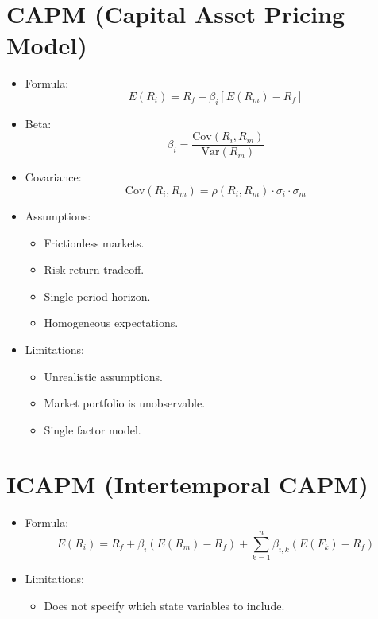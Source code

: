 \documentclass[twoside,openany]{book}
\begin{document}
\section*{CAPM (Capital Asset Pricing Model)}
\begin{itemize}
    \item Formula:
    \[ E(R_i) = R_f + \beta_i [E(R_m) - R_f] \]
    \item Beta:
    \[ \beta_i = \frac{\text{Cov}(R_i, R_m)}{\text{Var}(R_m)} \]
    \item Covariance:
    \[ \text{Cov}(R_i, R_m) = \rho(R_i, R_m) \cdot \sigma_i \cdot \sigma_m \]
    \item Assumptions:
    \begin{itemize}
        \item Frictionless markets.
        \item Risk-return tradeoff.
        \item Single period horizon.
        \item Homogeneous expectations.
    \end{itemize}
    \item Limitations:
    \begin{itemize}
        \item Unrealistic assumptions.
        \item Market portfolio is unobservable.
        \item Single factor model.
    \end{itemize}
\end{itemize}

\section*{ICAPM (Intertemporal CAPM)}
\begin{itemize}
    \item Formula:
    \[ E(R_i) = R_f + \beta_i (E(R_m) - R_f) + \sum_{k=1}^{n}\beta_{i,k} (E(F_k) - R_f) \]
    \item Limitations:
    \begin{itemize}
        \item Does not specify which state variables to include.
    \end{itemize}
\end{itemize}
\end{document}
